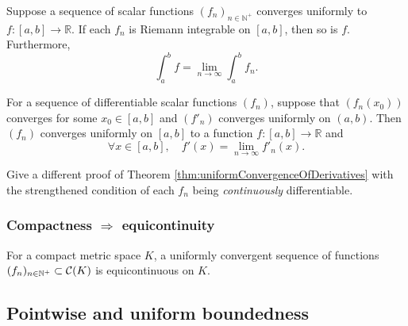 \begin{thm}
  \label{thm:uniformConvAndIntegral}
  Suppose a sequence of scalar functions $(f_n)_{n\in\mathbb{N}^+}$
  converges uniformly to $f:[a,b]\rightarrow \mathbb{R}$.
  If each $f_n$ is Riemann integrable on $[a,b]$,
  then so is $f$. Furthermore, 
  \begin{equation}
    \label{eq:uniformConvAndIntegral}
    \int_a^bf = \lim_{n\rightarrow \infty} \int_a^bf_n. 
  \end{equation}
\end{thm}

\begin{thm}
  \label{thm:uniformConvergenceOfDerivatives}
  For a sequence of differentiable scalar functions $(f_n)$, 
  suppose that $(f_n(x_0))$ converges for some $x_0\in[a,b]$
  and $(f'_n)$ converges uniformly on $(a,b)$. 
  Then $(f_n)$ converges uniformly on $[a,b]$
  to a function $f: [a,b]\rightarrow \mathbb{R}$
  and
  \begin{equation}
    \label{eq:uniformConvergenceOfDerivatives}
    \forall x\in [a,b], \quad
    f'(x) = \lim_{n\rightarrow \infty} f'_n(x).
  \end{equation}
\end{thm}

\begin{exc}
  Give a different proof of Theorem
  \ref{thm:uniformConvergenceOfDerivatives}
  with the strengthened condition of
  each $f_n$ being \emph{continuously} differentiable. 
\end{exc}

\subsubsection{Compactness $\Rightarrow$ equicontinuity}

\begin{thm}
  \label{thm:uniformConvergenceAndCompact2EquiCont}
  For a compact metric space $K$,
  a uniformly convergent sequence of functions 
  $(f_n)_{n\in\mathbb{N}^+}\subset {\cal C}(K)$
  is equicontinuous on $K$. 
\end{thm}

\subsection{Pointwise and uniform boundedness}

